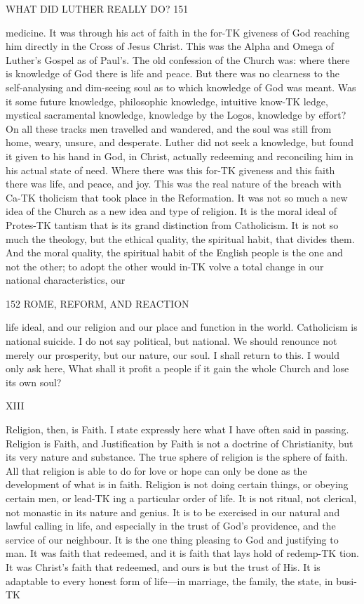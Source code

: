 \documentclass[12pt,a5paper,oneside]{book}
\begin{document}
{WHAT DID LUTHER REALLY DO? 151 

medicine. It was through his act of faith in the for-TK
giveness of God reaching him directly in the Cross of 
Jesus Christ. This was the Alpha and Omega of 
Luther's Gospel as of Paul's. The old confession of 
the Church was: where there is knowledge of God 
there is life and peace. But there was no clearness 
to the self-analysing and dim-seeing soul as to which 
knowledge of God was meant. Was it some future 
knowledge, philosophic knowledge, intuitive know-TK
ledge, mystical sacramental knowledge, knowledge by 
the Logos, knowledge by effort? On all these tracks 
men travelled and wandered, and the soul was still from 
home, weary, unsure, and desperate. Luther did not 
seek a knowledge, but found it given to his hand in 
God, in Christ, actually redeeming and reconciling him 
in his actual state of need. Where there was this for-TK
giveness and this faith there was life, and peace, and joy. 
This was the real nature of the breach with Ca-TK
tholicism that took place in the Reformation. It was 
not so much a new idea of the Church as a new idea 
and type of religion. It is the moral ideal of Protes-TK
tantism that is its grand distinction from Catholicism. 
It is not so much the theology, but the ethical quality, 
the spiritual habit, that divides them. And the moral 
quality, the spiritual habit of the English people is the 
one and not the other; to adopt the other would in-TK
volve a total change in our national characteristics, our 



152 ROME, REFORM, AND REACTION 

life ideal, and our religion and our place and function 
in the world. Catholicism is national suicide. I do 
not say political, but national. We should renounce 
not merely our prosperity, but our nature, our soul. I 
shall return to this. I would only ask here, What 
shall it profit a people if it gain the whole Church 
and lose its own soul? 

XIII 

Religion, then, is Faith. I state expressly here what 
I have often said in passing. Religion is Faith, and 
Justification by Faith is not a doctrine of Christianity, 
but its very nature and substance. The true sphere 
of religion is the sphere of faith. All that religion is 
able to do for love or hope can only be done as the 
development of what is in faith. Religion is not 
doing certain things, or obeying certain men, or lead-TK
ing a particular order of life. It is not ritual, not 
clerical, not monastic in its nature and genius. It is 
to be exercised in our natural and lawful calling in life, 
and especially in the trust of God's providence, and 
the service of our neighbour. It is the one thing 
pleasing to God and justifying to man. It was faith 
that redeemed, and it is faith that lays hold of redemp-TK
tion. It was Christ's faith that redeemed, and ours is 
but the trust of His. It is adaptable to every honest 
form of life---in marriage, the family, the state, in busi-TK



}
\end{document}
